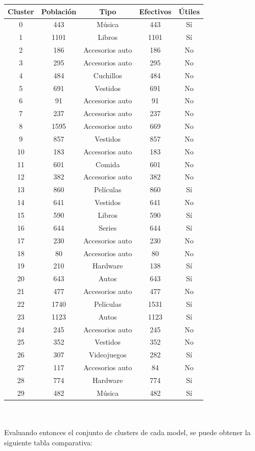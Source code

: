 \begin{tabular}{| c | c | c | c | c |}\hline
Cluster & Población & Tipo & Efectivos & Útiles\\\hline
0 & 443 & Música & 443 & Sí\\
1 & 1101 & Libros & 1101 & Sí\\
2 & 186 & Accesorios auto & 186 & No\\
3 & 295 & Accesorios auto & 295 & No\\
4 & 484 & Cuchillos & 484 & No\\
5 & 691 & Vestidos & 691 & No\\
6 & 91 & Accesorios auto & 91 & No\\
7 & 237 & Accesorios auto & 237 & No\\
8 & 1595 & Accesorios auto & 669 & No\\
9 & 857 & Vestidos & 857 & No\\
10 & 183 & Accesorios auto & 183 & No\\
11 & 601 & Comida & 601 & No\\
12 & 382 & Accesorios auto & 382 & No\\
13 & 860 & Películas & 860 & Sí\\
14 & 641 & Vestidos & 641 & No\\
15 & 590 & Libros & 590 & Sí\\
16 & 644 & Series & 644 & Sí\\
17 & 230 & Accesorios auto & 230 & No\\
18 & 80 & Accesorios auto & 80 & No\\
19 & 210 & Hardware & 138 & Sí\\
20 & 643 & Autos & 643 & Sí\\
21 & 477 & Accesorios auto & 477 & No\\
22 & 1740 & Películas & 1531 & Sí\\
23 & 1123 & Autos & 1123 & Sí\\
24 & 245 & Accesorios auto & 245 & No\\
25 & 352 & Vestidos & 352 & No\\
26 & 307 & Videojuegos & 282 & Sí\\
27 & 117 & Accesorios auto & 84 & No\\
28 & 774 & Hardware & 774 & Sí\\
29 & 482 & Música & 482 & Sí\\\hline
\end{tabular}
\\
\\
Evaluando entonces el conjunto de clusters de cada model, se puede obtener la siguiente tabla comparativa:\\
